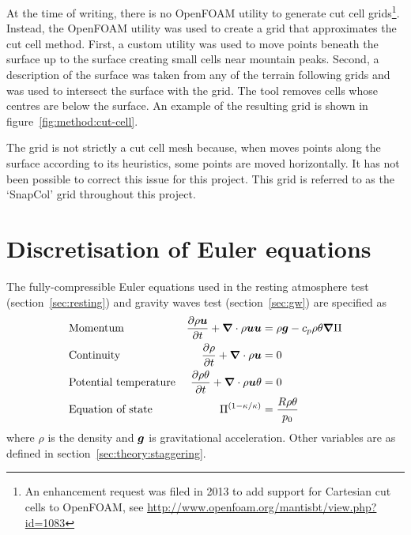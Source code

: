 At the time of writing, there is no OpenFOAM utility to generate cut cell grids\footnote{An enhancement request was filed in 2013 to add support for Cartesian cut cells to OpenFOAM, see \url{http://www.openfoam.org/mantisbt/view.php?id=1083}}.  Instead, the OpenFOAM utility  was used to create a grid that approximates the cut cell method.  First, a custom utility was used to move points beneath the surface up to the surface creating small cells near mountain peaks.  Second, a description of the surface was taken from any of the terrain following grids and  was used to intersect the surface with the grid.  The tool removes cells whose centres are below the surface.  An example of the resulting grid is shown in figure~\ref{fig:method:cut-cell}.

The grid is not strictly a cut cell mesh because, when  moves points along the surface according to its heuristics, some points are moved horizontally.  It has not been possible to correct this issue for this project.  This grid is referred to as the `SnapCol' grid throughout this project.


\section{Discretisation of Euler equations}
\label{sec:method:discretisation}

The fully-compressible Euler equations used in the resting atmosphere test (section~\ref{sec:resting}) and gravity waves test (section~\ref{sec:gw}) are specified as
\begin{subequations}
\begin{align}
& \text{Momentum} & \frac{\partial \rho \vect{u}}{\partial t} + \del \cdot \rho \vect{u} \vect{u} &= \rho \vect{g} - c_p \rho \theta \del \exner \label{eqn:method:momentum} \\
%
& \text{Continuity} & \frac{\partial \rho}{\partial t} + \del \cdot \rho \vect{u} &= 0 \label{eqn:method:continuity} \\
%
& \text{Potential temperature} & \frac{\partial \rho \theta}{\partial t} + \del \cdot \rho \vect{u} \theta &= 0 \\
%
& \text{Equation of state} & \exner^{(1 - \kappa / \kappa)} &= \frac{R \rho \theta}{p_0}
\end{align}
\end{subequations}
where $\rho$ is the density and $\bm{g}$ is gravitational acceleration.  Other variables are as defined in section~\ref{sec:theory:staggering}.

